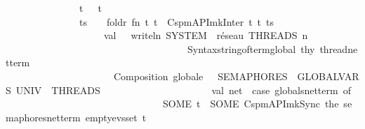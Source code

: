 \begin{isabellebody}
\ \ \ \ \ \ \ \ \ \ \ \ \ \ {\isacharbar}{\kern0pt}\ {\isacharbrackleft}{\kern0pt}t{\isacharbrackright}{\kern0pt}\ \ {\isacharequal}{\kern0pt}{\isachargreater}{\kern0pt}\ t\isanewline
\ \ \ \ \ \ \ \ \ \ \ \ \ \ {\isacharbar}{\kern0pt}\ ts\ \ \ {\isacharequal}{\kern0pt}{\isachargreater}{\kern0pt}\ foldr{}\ {\isacharparenleft}{\kern0pt}fn\ {\isacharparenleft}{\kern0pt}t{}{\isacharcomma}{\kern0pt}\ t{}{\isacharparenright}{\kern0pt}\ {\isacharequal}{\kern0pt}{\isachargreater}{\kern0pt}\ Cspm{\isacharunderscore}{\kern0pt}API{\isachardot}{\kern0pt}mk{\isacharunderscore}{\kern0pt}Inter\ t{}\ t{}{\isacharparenright}{\kern0pt}\ ts{\isacharparenright}{\kern0pt}\isanewline
\ \ \ \ \ \ \ \ \ \ \isanewline
\ \ \ \ \ \ \ \ \ \ \ \ \ \ \ \ \ \ \ \ val\ {\isacharunderscore}{\kern0pt}\ {\isacharequal}{\kern0pt}\ writeln\ {\isacharparenleft}{\kern0pt}{\isachardoublequote}{\kern0pt}{\isacharbrackleft}{\kern0pt}SYSTEM{\isacharbrackright}{\kern0pt}\ \ réseau\ THREADS\ {\isacharcolon}{\kern0pt}{\isacharbackslash}{\kern0pt}n\ \ {\isachardoublequote}{\kern0pt}\ {\isacharcircum}{\kern0pt}\isanewline
\ \ \ \ \ \ \ \ \ \ \ \ \ \ \ \ \ \ \ \ \ \ \ \ \ \ \ \ \ \ \ \ \ \ \ \ \ Syntax{\isachardot}{\kern0pt}string{\isacharunderscore}{\kern0pt}of{\isacharunderscore}{\kern0pt}term{\isacharunderscore}{\kern0pt}global\ thy{\isacharprime}{\kern0pt}\ thread{\isacharunderscore}{\kern0pt}net{\isacharunderscore}{\kern0pt}term{\isacharparenright}{\kern0pt}\isanewline
\ \ \ \ \ \ \ \ \ \ \ \ \ \ \ \ \ \ \ \ {\isacharparenleft}{\kern0pt}{\isacharasterisk}{\kern0pt}\ {}{\isachardot}{\kern0pt}\ Composition\ globale\ {\isacharcolon}{\kern0pt}\ \ {\isacharparenleft}{\kern0pt}SEMAPHORES\ {\isacharbar}{\kern0pt}{\isacharbar}{\kern0pt}{\isacharbar}{\kern0pt}\ GLOBALVARS{\isacharparenright}{\kern0pt}\ {\isacharbrackleft}{\kern0pt}{\isacharbar}{\kern0pt}UNIV{\isacharbar}{\kern0pt}{\isacharbrackright}{\kern0pt}\ \ THREADS\ \ {\isacharasterisk}{\kern0pt}{\isacharparenright}{\kern0pt}\isanewline
\isanewline
\ \ \ \ \ \ \ \ \ \ \ \ \ \ \ \ \ \ \ \ val\ net{}\ {\isacharequal}{\kern0pt}\ {\isacharparenleft}{\kern0pt}case\ globals{\isacharunderscore}{\kern0pt}net{\isacharunderscore}{\kern0pt}term\ of\ \isanewline
\ \ \ \ \ \ \ \ \ \ \ \ \ \ \ \ \ \ \ \ \ \ \ \ \ \ \ \ \ \ \ \ SOME\ t\ {\isacharequal}{\kern0pt}{\isachargreater}{\kern0pt}\ SOME{\isacharparenleft}{\kern0pt}\ Cspm{\isacharunderscore}{\kern0pt}API{\isachardot}{\kern0pt}mk{\isacharunderscore}{\kern0pt}Sync\ {\isacharparenleft}{\kern0pt}the\ semaphores{\isacharunderscore}{\kern0pt}net{\isacharunderscore}{\kern0pt}term{\isacharparenright}{\kern0pt}\ empty{\isacharunderscore}{\kern0pt}evs{\isacharunderscore}{\kern0pt}set\ t{\isacharparenright}{\kern0pt}\isanewline

\end{isabellebody}
